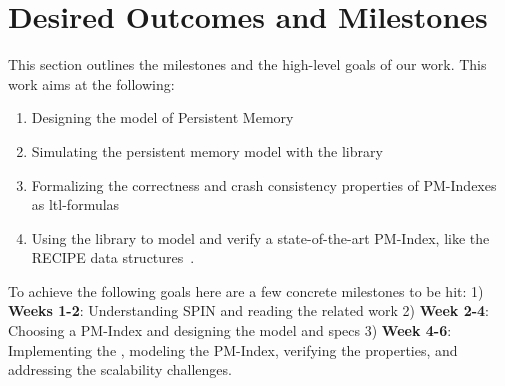 \section{Desired Outcomes and Milestones}

This section outlines the milestones and the high-level goals of our work. This
work aims at the following:
\begin{enumerate}
    \item Designing the model of Persistent Memory
    \item Simulating the persistent memory model with the \checker library
    \item Formalizing the correctness and crash consistency properties of
      PM-Indexes as ltl-formulas
    \item Using the \checker library to model and verify a state-of-the-art
      PM-Index, like the RECIPE data structures~\cite{LeeEtAl19-Recipe}.
\end{enumerate}

To achieve the following goals here are a few concrete milestones to be hit:
1) \textbf{Weeks 1-2}: Understanding SPIN and reading the related work
2) \textbf{Week 2-4}: Choosing a PM-Index and designing the model and specs
3) \textbf{Week 4-6}: Implementing the \checker, modeling the PM-Index,
verifying the properties, and addressing the scalability challenges.
